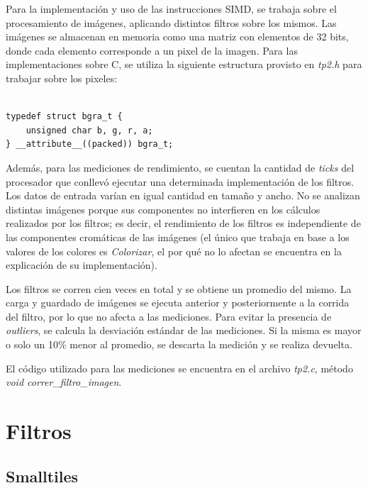 \documentclass[a4paper]{article}
\newenvironment{codesnippet}{%
	\begin{Sbox}\begin{minipage}{\textwidth}\sffamily\small}%
	{\end{minipage}\end{Sbox}%
		\begin{center}%
		\vspace{-0.4cm}\colorbox{litegrey}{\TheSbox}\end{center}\vspace{0.3cm}}
\begin{document}
Para la implementación y uso de las instrucciones SIMD, se trabaja sobre el procesamiento de imágenes, aplicando distintos filtros sobre los mismos. Las imágenes se almacenan en memoria como una matriz con elementos de 32 bits, donde cada elemento corresponde a un pixel de la imagen. Para las implementaciones sobre C, se utiliza la siguiente estructura provisto en \textit{tp2.h} para trabajar sobre los pixeles:
\begin{codesnippet}
\begin{verbatim}

typedef struct bgra_t {
	unsigned char b, g, r, a;
} __attribute__((packed)) bgra_t;

\end{verbatim}
\end{codesnippet}

Además, para las mediciones de rendimiento, se cuentan la cantidad de \textit{ticks} del procesador que conllevó ejecutar una determinada implementación de los filtros. Los datos de entrada varían en igual cantidad en tamaño y ancho. No se analizan distintas imágenes porque sus componentes no interfieren en los cálculos realizados por los filtros; es decir, el rendimiento de los filtros es independiente de las componentes cromáticas de las imágenes (el único que trabaja en base a los valores de los colores es \textit{Colorizar}, el por qué no lo afectan se encuentra en la explicación de su implementación).

Los filtros se corren cien veces en total y se obtiene un promedio del mismo. La carga y guardado de imágenes se ejecuta anterior y posteriormente a la corrida del filtro, por lo que no afecta a las mediciones. Para evitar la presencia de \textit{outliers}, se calcula la desviación estándar de las mediciones. Si la misma es mayor o solo un 10\% menor al promedio, se descarta la medición y se realiza devuelta.

El código utilizado para las mediciones se encuentra en el archivo \textit{tp2.c}, método \textit{void correr_filtro_imagen}.
\newpage
\section{Filtros} 
\subsection{Smalltiles}
\end{document}
